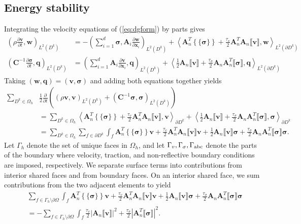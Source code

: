 \documentclass{siamart0216}
\newcommand{\pd}[2]{\frac{\partial#1}{\partial#2}}
\newcommand{\LRp}[1]{\left( #1 \right)}
\newcommand{\LRa}[1]{\left\langle #1 \right\rangle}
\newcommand{\LRb}[1]{\left| #1 \right|}
\newcommand{\LRc}[1]{\left\{ #1 \right\}}
\newcommand{\jump}[1] {\ensuremath{\llbracket#1\rrbracket}}
\newcommand{\avg}[1] {\ensuremath{\LRc{\!\{#1\}\!}}}
\newcommand{\Oh}{{\Omega_h}}
\newcommand{\Lk}{L^2\LRp{D^k}}
\newcommand{\Ldk}{L^2\LRp{\partial D^k}}
\begin{document}
\subsection{Energy stability}

Integrating the velocity equations of (\ref{eq:dgform}) by parts gives
\begin{align*}
\LRp{\rho \pd{\bm{v}}{t},\bm{w}}_{\Lk} &= -\LRp{ \sum_{i=1}^d \bm{\sigma},\bm{A}_i \pd{\bm{w}}{\bm{x}_i}}_{\Lk}  + \LRa{\bm{A}_n^T\avg{\bm{\sigma}} + \frac{\tau_v}{2}\bm{A}_n^T\bm{A}_n\jump{\bm{v}},\bm{w}}_{\Ldk} \nonumber\\
\LRp{\bm{C}^{-1} \pd{\bm{\sigma}}{t},\bm{q}}_{\Lk} &= \LRp{\sum_{i=1}^d \bm{A}_i \pd{\bm{v}}{\bm{x}_i},\bm{q}}_{\Lk} + \LRa{\frac{1}{2}\bm{A}_n\jump{\bm{v}} + \frac{\tau_{\sigma}}{2}\bm{A}_n\bm{A}_n^T\jump{\bm{\sigma}},\bm{q}}_{\Ldk} 
\end{align*}
Taking $(\bm{w},\bm{q}) = (\bm{v},\bm{\sigma})$ and adding both equations together yields
\begin{align*}
\sum_{D^k\in \Oh}&\frac{1}{2}\pd{}{t}\LRp{\LRp{\rho \bm{v},\bm{v}}_{\Lk} + \LRp{\bm{C}^{-1} \bm{\sigma},\bm{\sigma}}_{\Lk}} \\
&=\sum_{D^k\in \Omega_h}\LRa{\bm{A}_n^T\avg{\bm{\sigma}} + \frac{\tau_v}{2}\bm{A}_n^T\bm{A}_n\jump{\bm{v}},\bm{v}}_{\partial D^k}+ \LRa{\frac{1}{2}\bm{A}_n\jump{\bm{v}} + \frac{\tau_\sigma}{2}\bm{A}_n\bm{A}_n^T\jump{\bm{\sigma}},\bm{\sigma}}_{\partial D^k}  \\
&=\sum_{D^k\in \Omega_h}\sum_{f\in \partial D^k}\int_{f}{\bm{A}_n^T\avg{\bm{\sigma}}\bm{v} + \frac{\tau_v}{2}\bm{A}_n^T\bm{A}_n\jump{\bm{v}}\bm{v}} + {\frac{1}{2}\bm{A}_n\jump{\bm{v}}\bm{\sigma} + \frac{\tau_\sigma}{2}\bm{A}_n\bm{A}_n^T\jump{\bm{\sigma}}\bm{\sigma}}.
\end{align*}
Let $\Gamma_h$ denote the set of unique faces in $\Oh$, and let $\Gamma_v,\Gamma_\sigma,\Gamma_{\rm abc}$ denote the parts of the boundary where velocity, traction, and non-reflective boundary conditions are imposed, respectively.  We separate surface terms into contributions from interior shared faces and from boundary faces.  On an interior shared face, we sum contributions from the two adjacent elements to yield
\begin{align*}
&\sum_{f\in \Gamma_h \setminus \partial \Omega} \int_{f}{\bm{A}_n^T\avg{\bm{\sigma}}\bm{v} + \frac{\tau_v}{2}\bm{A}_n^T\bm{A}_n\jump{\bm{v}}\bm{v}} + {\frac{1}{2}\bm{A}_n\jump{\bm{v}}\bm{\sigma} + \frac{\tau_\sigma}{2}\bm{A}_n\bm{A}_n^T\jump{\bm{\sigma}}\bm{\sigma}}\\
&= - \sum_{f \in\Gamma_h \setminus \partial \Omega} \int_{f} \frac{\tau_v}{2}\LRb{\bm{A}_n\jump{\bm{v}}}^2 + \frac{\tau_\sigma}{2}\LRb{\bm{A}_n^T\jump{\bm{\sigma}}}^2.  
\end{align*}
\end{document}
